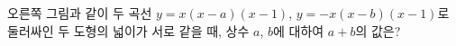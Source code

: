 \noindent\begin{minipage}[t]{0.58\linewidth}\vspace{0pt}\raggedright 오른쪽 그림과 같이 두 곡선 $y=x(x-a)(x-1)$, $y=-x(x-b)(x-1)$로 둘러싸인 두 도형의 넓이가 서로 같을 때, 상수 $a$, $b$에 대하여 $a+b$의 값은? \end{minipage}\hfill\begin{minipage}[t]{0.4\linewidth}\vspace{0pt}\centering \resizebox{\ifdim\width>\linewidth\linewidth\else\width\fi}{!}{}\end{minipage}\par
{}
